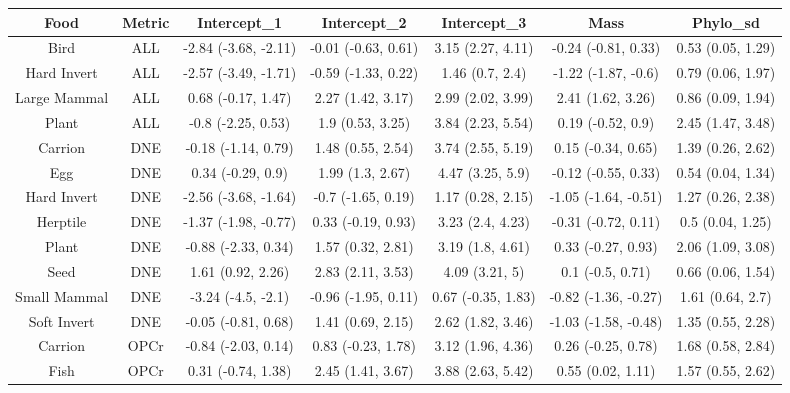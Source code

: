 \begin{table}
\centering\begingroup\fontsize{10}{12}\selectfont

\begin{tabular}[t]{c|c|c|c|c|c|c}
\hline
Food & Metric & Intercept_1 & Intercept_2 & Intercept_3 & Mass & Phylo_sd\\
\hline
Bird & ALL & -2.84 (-3.68, -2.11) & -0.01 (-0.63, 0.61) & 3.15 (2.27, 4.11) & -0.24 (-0.81, 0.33) & 0.53 (0.05, 1.29)\\
\hline
Hard Invert & ALL & -2.57 (-3.49, -1.71) & -0.59 (-1.33, 0.22) & 1.46 (0.7, 2.4) & -1.22 (-1.87, -0.6) & 0.79 (0.06, 1.97)\\
\hline
Large Mammal & ALL & 0.68 (-0.17, 1.47) & 2.27 (1.42, 3.17) & 2.99 (2.02, 3.99) & 2.41 (1.62, 3.26) & 0.86 (0.09, 1.94)\\
\hline
Plant & ALL & -0.8 (-2.25, 0.53) & 1.9 (0.53, 3.25) & 3.84 (2.23, 5.54) & 0.19 (-0.52, 0.9) & 2.45 (1.47, 3.48)\\
\hline
Carrion & DNE & -0.18 (-1.14, 0.79) & 1.48 (0.55, 2.54) & 3.74 (2.55, 5.19) & 0.15 (-0.34, 0.65) & 1.39 (0.26, 2.62)\\
\hline
Egg & DNE & 0.34 (-0.29, 0.9) & 1.99 (1.3, 2.67) & 4.47 (3.25, 5.9) & -0.12 (-0.55, 0.33) & 0.54 (0.04, 1.34)\\
\hline
Hard Invert & DNE & -2.56 (-3.68, -1.64) & -0.7 (-1.65, 0.19) & 1.17 (0.28, 2.15) & -1.05 (-1.64, -0.51) & 1.27 (0.26, 2.38)\\
\hline
Herptile & DNE & -1.37 (-1.98, -0.77) & 0.33 (-0.19, 0.93) & 3.23 (2.4, 4.23) & -0.31 (-0.72, 0.11) & 0.5 (0.04, 1.25)\\
\hline
Plant & DNE & -0.88 (-2.33, 0.34) & 1.57 (0.32, 2.81) & 3.19 (1.8, 4.61) & 0.33 (-0.27, 0.93) & 2.06 (1.09, 3.08)\\
\hline
Seed & DNE & 1.61 (0.92, 2.26) & 2.83 (2.11, 3.53) & 4.09 (3.21, 5) & 0.1 (-0.5, 0.71) & 0.66 (0.06, 1.54)\\
\hline
Small Mammal & DNE & -3.24 (-4.5, -2.1) & -0.96 (-1.95, 0.11) & 0.67 (-0.35, 1.83) & -0.82 (-1.36, -0.27) & 1.61 (0.64, 2.7)\\
\hline
Soft Invert & DNE & -0.05 (-0.81, 0.68) & 1.41 (0.69, 2.15) & 2.62 (1.82, 3.46) & -1.03 (-1.58, -0.48) & 1.35 (0.55, 2.28)\\
\hline
Carrion & OPCr & -0.84 (-2.03, 0.14) & 0.83 (-0.23, 1.78) & 3.12 (1.96, 4.36) & 0.26 (-0.25, 0.78) & 1.68 (0.58, 2.84)\\
\hline
Fish & OPCr & 0.31 (-0.74, 1.38) & 2.45 (1.41, 3.67) & 3.88 (2.63, 5.42) & 0.55 (0.02, 1.11) & 1.57 (0.55, 2.62)\\

\end{tabular}
\end{table}
